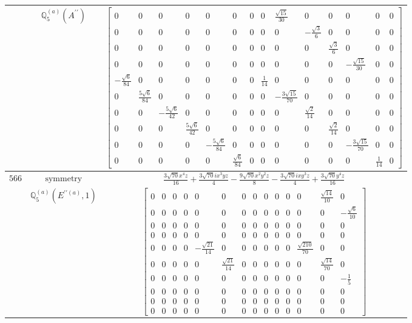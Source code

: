 \documentclass[fleqn,8pt,landscape]{jsarticle}
\begin{document}
\begin{longtable}{ccc}
$  $ & $ \mathbb{Q}_{5}^{(a)}(A^{\prime\prime}) $ & $ \begin{bmatrix} 0 & 0 & 0 & 0 & 0 & 0 & 0 & 0 & \frac{\sqrt{15}}{30} & 0 & 0 & 0 & 0 & 0 \\ 0 & 0 & 0 & 0 & 0 & 0 & 0 & 0 & 0 & - \frac{\sqrt{3}}{6} & 0 & 0 & 0 & 0 \\ 0 & 0 & 0 & 0 & 0 & 0 & 0 & 0 & 0 & 0 & \frac{\sqrt{3}}{6} & 0 & 0 & 0 \\ 0 & 0 & 0 & 0 & 0 & 0 & 0 & 0 & 0 & 0 & 0 & - \frac{\sqrt{15}}{30} & 0 & 0 \\ - \frac{\sqrt{6}}{84} & 0 & 0 & 0 & 0 & 0 & 0 & \frac{1}{14} & 0 & 0 & 0 & 0 & 0 & 0 \\ 0 & \frac{5 \sqrt{6}}{84} & 0 & 0 & 0 & 0 & 0 & 0 & - \frac{3 \sqrt{15}}{70} & 0 & 0 & 0 & 0 & 0 \\ 0 & 0 & - \frac{5 \sqrt{6}}{42} & 0 & 0 & 0 & 0 & 0 & 0 & \frac{\sqrt{2}}{14} & 0 & 0 & 0 & 0 \\ 0 & 0 & 0 & \frac{5 \sqrt{6}}{42} & 0 & 0 & 0 & 0 & 0 & 0 & \frac{\sqrt{2}}{14} & 0 & 0 & 0 \\ 0 & 0 & 0 & 0 & - \frac{5 \sqrt{6}}{84} & 0 & 0 & 0 & 0 & 0 & 0 & - \frac{3 \sqrt{15}}{70} & 0 & 0 \\ 0 & 0 & 0 & 0 & 0 & \frac{\sqrt{6}}{84} & 0 & 0 & 0 & 0 & 0 & 0 & \frac{1}{14} & 0 \end{bmatrix} $ \\ \hline
$ 566 $ & $ \text{symmetry} $ & $ \frac{3 \sqrt{70} x^{4} z}{16} + \frac{3 \sqrt{70} i x^{3} y z}{4} - \frac{9 \sqrt{70} x^{2} y^{2} z}{8} - \frac{3 \sqrt{70} i x y^{3} z}{4} + \frac{3 \sqrt{70} y^{4} z}{16} $ \\
$  $ & $ \mathbb{Q}_{5}^{(a)}(E^{\prime\prime(a)},1) $ & $ \begin{bmatrix} 0 & 0 & 0 & 0 & 0 & 0 & 0 & 0 & 0 & 0 & 0 & 0 & \frac{\sqrt{14}}{10} & 0 \\ 0 & 0 & 0 & 0 & 0 & 0 & 0 & 0 & 0 & 0 & 0 & 0 & 0 & - \frac{\sqrt{6}}{10} \\ 0 & 0 & 0 & 0 & 0 & 0 & 0 & 0 & 0 & 0 & 0 & 0 & 0 & 0 \\ 0 & 0 & 0 & 0 & 0 & 0 & 0 & 0 & 0 & 0 & 0 & 0 & 0 & 0 \\ 0 & 0 & 0 & 0 & - \frac{\sqrt{21}}{14} & 0 & 0 & 0 & 0 & 0 & 0 & \frac{\sqrt{210}}{70} & 0 & 0 \\ 0 & 0 & 0 & 0 & 0 & \frac{\sqrt{21}}{14} & 0 & 0 & 0 & 0 & 0 & 0 & \frac{\sqrt{14}}{70} & 0 \\ 0 & 0 & 0 & 0 & 0 & 0 & 0 & 0 & 0 & 0 & 0 & 0 & 0 & - \frac{1}{5} \\ 0 & 0 & 0 & 0 & 0 & 0 & 0 & 0 & 0 & 0 & 0 & 0 & 0 & 0 \\ 0 & 0 & 0 & 0 & 0 & 0 & 0 & 0 & 0 & 0 & 0 & 0 & 0 & 0 \\ 0 & 0 & 0 & 0 & 0 & 0 & 0 & 0 & 0 & 0 & 0 & 0 & 0 & 0 \end{bmatrix} $ \\ \hline

\end{longtable}
\end{document}
